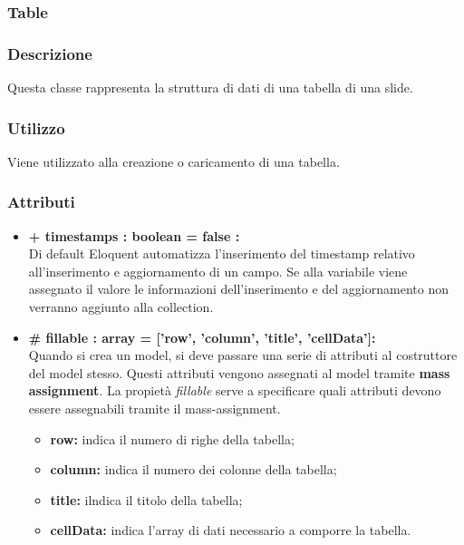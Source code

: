 \newpage
\subsubsection{Table}


	\subsubsection*{Descrizione}
	Questa classe rappresenta la struttura di dati di una tabella di una slide.
	
	\subsubsection*{Utilizzo}
	Viene utilizzato alla creazione o caricamento di una tabella.
	
	\subsubsection*{Attributi}
	\begin{itemize}
		\item \textbf{+ timestamps : boolean = false :}\\
		Di default Eloquent automatizza l'inserimento del timestamp relativo all'inserimento e aggiornamento di un campo. Se alla variabile viene assegnato il valore le informazioni dell'inserimento e del aggiornamento non verranno aggiunto alla collection.
		\item \textbf{\# fillable : array = [’row’, ’column’, ’title’, ’cellData’]:}\\
		Quando si crea un model, si deve passare una serie di attributi al costruttore del model stesso. Questi attributi vengono assegnati al model tramite \textbf{mass assignment}. La propietà \textit{fillable} serve a specificare quali attributi devono essere assegnabili tramite il mass-assignment.
		\begin{itemize}
			\item \textbf{row:} indica il numero di righe della tabella;
			\item \textbf{column:} indica il numero dei colonne della tabella;
			\item \textbf{title:} ilndica il titolo della tabella;
			\item \textbf{cellData:} indica l'array di dati necessario a comporre la tabella.
		\end{itemize}

	\end{itemize}